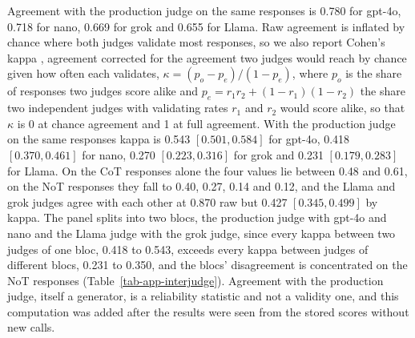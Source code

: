 Agreement with the production judge on the same responses is 0.780 for
gpt-4o, 0.718 for nano, 0.669 for grok and 0.655 for Llama.
Raw agreement is inflated by chance where both judges validate most
responses, so we also report Cohen's kappa \citep{cohen60}, agreement corrected for the
agreement two judges would reach by chance given how often each validates,
$\kappa=(p_o-p_e)/(1-p_e)$, where $p_o$ is the share of responses two judges
score alike and $p_e=r_1r_2+(1-r_1)(1-r_2)$ the share two independent judges
with validating rates $r_1$ and $r_2$ would score alike, so that $\kappa$ is
0 at chance agreement and 1 at full agreement.
With the production judge on the same responses kappa is 0.543
$[0.501, 0.584]$ for gpt-4o, 0.418 $[0.370, 0.461]$ for nano, 0.270
$[0.223, 0.316]$ for grok and 0.231 $[0.179, 0.283]$ for Llama. On the CoT
responses alone the four values lie between 0.48 and 0.61, on the NoT
responses they fall to 0.40, 0.27, 0.14 and 0.12, and the Llama and grok
judges agree with each other at 0.870 raw but 0.427 $[0.345, 0.499]$ by
kappa. The panel splits into two blocs, the production judge with gpt-4o and
nano and the Llama judge with the grok judge, since every kappa between two
judges of one bloc, 0.418 to 0.543, exceeds every kappa between judges of
different blocs, 0.231 to 0.350, and the blocs' disagreement is concentrated
on the NoT responses (Table~\ref{tab-app-interjudge}).
Agreement with the production judge, itself a generator, is a reliability
statistic and not a validity one, and this computation was added after the
results were seen from the stored scores without new calls.
